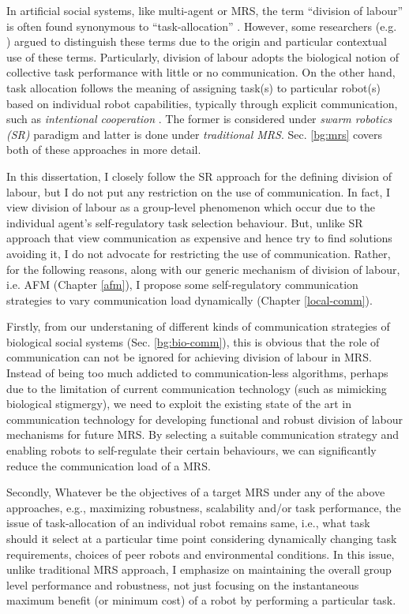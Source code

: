 In artificial social systems, like multi-agent or MRS, the term ``division of labour'' is often found  synonymous to ``task-allocation'' . However,  some researchers (e.g. \cite{Labella2007}) argued to distinguish these terms due to the origin and particular contextual use of these terms. Particularly,  division of labour adopts the biological notion of collective task  performance with little or no communication. On the other hand, task allocation follows  the meaning of assigning task(s) to particular robot(s) based on individual robot capabilities, typically through explicit communication, such as {\em intentional cooperation} \cite{Parker1998}.  The former is considered under {\em swarm robotics (SR)} paradigm and latter is done under {\em traditional MRS}. Sec. \ref{bg:mrs} covers both of these approaches in more detail. 

In this dissertation, I closely follow the SR approach for the defining division of labour, but I do not put any restriction on the use of communication. In fact, I view division of labour as a group-level phenomenon which occur due to the individual agent's  self-regulatory task selection behaviour. But, unlike  SR approach that view communication as expensive and hence try to find solutions avoiding it, I do not advocate for restricting the  use of communication. Rather, for the following reasons, along with our generic mechanism of division of labour, i.e. AFM (Chapter \ref{afm}), I propose some self-regulatory communication strategies to vary  communication load dynamically (Chapter  \ref{local-comm}). 

Firstly, from our understaning of different kinds of communication strategies of biological social systems (Sec. \ref{bg:bio-comm}), this is obvious that the role of communication can not be ignored for achieving division of labour in MRS. Instead of being too much addicted to communication-less algorithms, perhaps due to the limitation of current communication  technology (such as mimicking biological stigmergy), we need to exploit the existing state of the art  in communication technology for developing functional and robust division of labour mechanisms for future MRS.  By selecting a suitable communication strategy and enabling robots to self-regulate their  certain behaviours,  we can significantly reduce the communication load of a MRS.

Secondly, Whatever be the objectives of a target MRS under any of the above approaches, e.g., maximizing robustness, scalability and/or task performance, the issue of task-allocation of an individual robot remains same, i.e., what task should it select at a particular time point considering dynamically changing task requirements, choices of peer robots and environmental conditions. In this issue, unlike traditional MRS approach, I emphasize on maintaining the overall group level performance and robustness, not just focusing on the instantaneous maximum benefit (or minimum cost) of a robot by performing a particular task.

